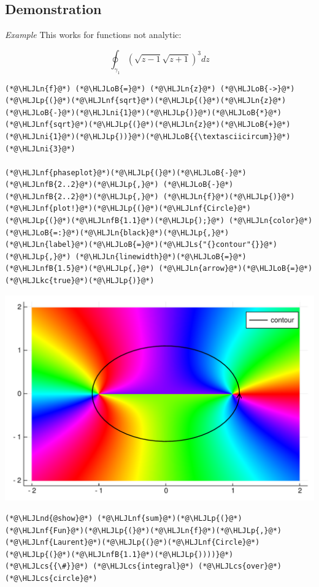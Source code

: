 \documentclass[12pt,a4paper]{article}
\newcommand{\HLJLkc}[1]{\textcolor[RGB]{59,151,46}{\textit{#1}}}
\newcommand{\HLJLn}[1]{#1}
\newcommand{\HLJLnd}[1]{\textcolor[RGB]{214,102,97}{#1}}
\newcommand{\HLJLnf}[1]{\textcolor[RGB]{66,102,213}{#1}}
\newcommand{\HLJLs}[1]{\textcolor[RGB]{201,61,57}{#1}}
\newcommand{\HLJLnfB}[1]{\textcolor[RGB]{59,151,46}{#1}}
\newcommand{\HLJLni}[1]{\textcolor[RGB]{59,151,46}{#1}}
\newcommand{\HLJLoB}[1]{\textcolor[RGB]{102,102,102}{\textbf{#1}}}
\newcommand{\HLJLp}[1]{#1}
\newcommand{\HLJLcs}[1]{\textcolor[RGB]{153,153,119}{\textit{#1}}}
\begin{document}
\subsection{Demonstration}
\emph{Example} This works for functions not analytic:

\[
    \oint_{\gamma_1} (\sqrt{z-1}\sqrt{z+1})^3 dz 
\]

\begin{lstlisting}
(*@\HLJLn{f}@*) (*@\HLJLoB{=}@*) (*@\HLJLn{z}@*) (*@\HLJLoB{->}@*) (*@\HLJLp{(}@*)(*@\HLJLnf{sqrt}@*)(*@\HLJLp{(}@*)(*@\HLJLn{z}@*)(*@\HLJLoB{-}@*)(*@\HLJLni{1}@*)(*@\HLJLp{)}@*)(*@\HLJLoB{*}@*)(*@\HLJLnf{sqrt}@*)(*@\HLJLp{(}@*)(*@\HLJLn{z}@*)(*@\HLJLoB{+}@*)(*@\HLJLni{1}@*)(*@\HLJLp{))}@*)(*@\HLJLoB{{\textasciicircum}}@*)(*@\HLJLni{3}@*)

(*@\HLJLnf{phaseplot}@*)(*@\HLJLp{(}@*)(*@\HLJLoB{-}@*)(*@\HLJLnfB{2..2}@*)(*@\HLJLp{,}@*) (*@\HLJLoB{-}@*)(*@\HLJLnfB{2..2}@*)(*@\HLJLp{,}@*) (*@\HLJLn{f}@*)(*@\HLJLp{)}@*)
(*@\HLJLnf{plot!}@*)(*@\HLJLp{(}@*)(*@\HLJLnf{Circle}@*)(*@\HLJLp{(}@*)(*@\HLJLnfB{1.1}@*)(*@\HLJLp{);}@*) (*@\HLJLn{color}@*)(*@\HLJLoB{=:}@*)(*@\HLJLn{black}@*)(*@\HLJLp{,}@*) (*@\HLJLn{label}@*)(*@\HLJLoB{=}@*)(*@\HLJLs{"{}contour"{}}@*)(*@\HLJLp{,}@*) (*@\HLJLn{linewidth}@*)(*@\HLJLoB{=}@*)(*@\HLJLnfB{1.5}@*)(*@\HLJLp{,}@*) (*@\HLJLn{arrow}@*)(*@\HLJLoB{=}@*)(*@\HLJLkc{true}@*)(*@\HLJLp{)}@*)
\end{lstlisting}

\includegraphics[width=\linewidth]{figures/Lecture3_17_1.pdf}

\begin{lstlisting}
(*@\HLJLnd{@show}@*) (*@\HLJLnf{sum}@*)(*@\HLJLp{(}@*)(*@\HLJLnf{Fun}@*)(*@\HLJLp{(}@*)(*@\HLJLn{f}@*)(*@\HLJLp{,}@*) (*@\HLJLnf{Laurent}@*)(*@\HLJLp{(}@*)(*@\HLJLnf{Circle}@*)(*@\HLJLp{(}@*)(*@\HLJLnfB{1.1}@*)(*@\HLJLp{))))}@*)  (*@\HLJLcs{{\#}}@*) (*@\HLJLcs{integral}@*) (*@\HLJLcs{over}@*) (*@\HLJLcs{circle}@*)
\end{lstlisting}
\end{document}
